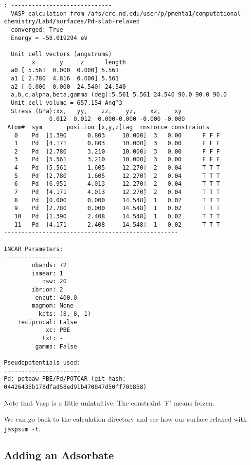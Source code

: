 \documentclass[11pt]{article}
\begin{document}
\begin{verbatim}
: -----------------------------
  VASP calculation from /afs/crc.nd.edu/user/p/pmehta1/computational-chemistry/Lab4/surfaces/Pd-slab-relaxed
  converged: True
  Energy = -58.019294 eV

  Unit cell vectors (angstroms)
        x       y     z      length
  a0 [ 5.561  0.000  0.000] 5.561
  a1 [ 2.780  4.816  0.000] 5.561
  a2 [ 0.000  0.000  24.540] 24.540
  a,b,c,alpha,beta,gamma (deg):5.561 5.561 24.540 90.0 90.0 90.0
  Unit cell volume = 657.154 Ang^3
  Stress (GPa):xx,   yy,    zz,    yz,    xz,    xy
             0.012  0.012  0.000-0.000 -0.000 -0.000
 Atom#  sym       position [x,y,z]tag  rmsForce constraints
   0    Pd  [1.390      0.803     10.000]  3   0.00      F F F
   1    Pd  [4.171      0.803     10.000]  3   0.00      F F F
   2    Pd  [2.780      3.210     10.000]  3   0.00      F F F
   3    Pd  [5.561      3.210     10.000]  3   0.00      F F F
   4    Pd  [5.561      1.605     12.270]  2   0.04      T T T
   5    Pd  [2.780      1.605     12.270]  2   0.04      T T T
   6    Pd  [6.951      4.013     12.270]  2   0.04      T T T
   7    Pd  [4.171      4.013     12.270]  2   0.04      T T T
   8    Pd  [0.000      0.000     14.548]  1   0.02      T T T
   9    Pd  [2.780      0.000     14.548]  1   0.02      T T T
   10   Pd  [1.390      2.408     14.548]  1   0.02      T T T
   11   Pd  [4.171      2.408     14.548]  1   0.02      T T T
--------------------------------------------------

INCAR Parameters:
-----------------
        nbands: 72
        ismear: 1
           nsw: 20
        ibrion: 2
         encut: 400.0
        magmom: None
          kpts: (8, 8, 1)
    reciprocal: False
            xc: PBE
           txt: -
         gamma: False

Pseudopotentials used:
----------------------
Pd: potpaw_PBE/Pd/POTCAR (git-hash: 04426435b178dfad58ed91b470847d50ff70b858)
\end{verbatim}

Note that Vasp is a little unintuitive. The constraint 'F' means frozen.

We can go back to the calculation directory and see how our surface relaxed with \texttt{jaspsum -t}.



\subsection{Adding an Adsorbate}
\label{sec:org754c198}
\end{document}
